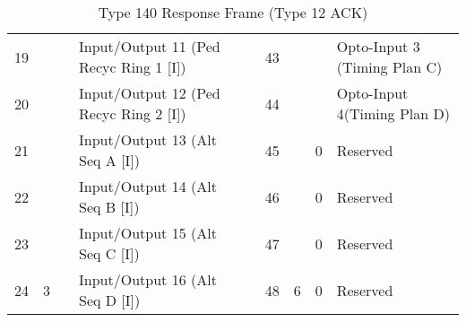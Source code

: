 \documentclass[]{article}
\begin{document}
\begin{landscape}
\begin{table}[]
\begin{tabular}{lllllllll}
			19           &                     &                & Input/Output 11 (Ped Recyc Ring 1 {[}I{]})   &                    & 43           &                     &                & Opto-Input 3 (Timing Plan C)          \\
			20           &                     &                & Input/Output 12 (Ped Recyc Ring 2 {[}I{]})   &                    & 44           &                     &                & Opto-Input 4(Timing Plan D)           \\ \cline{8-9} 
			21           &                     &                & Input/Output 13 (Alt Seq A {[}I{]})          &                    & 45           &                     & 0              & Reserved                              \\
			22           &                     &                & Input/Output 14 (Alt Seq B {[}I{]})          &                    & 46           &                     & 0              & Reserved                              \\
			23           &                     &                & Input/Output 15 (Alt Seq C {[}I{]})          &                    & 47           &                     & 0              & Reserved                              \\
			24           & \multirow{-8}{*}{3} &                & Input/Output 16 (Alt Seq D {[}I{]})          &                    & 48           & \multirow{-8}{*}{6} & 0              & Reserved                              \\ \cline{1-4} \cline{6-9} 
		\end{tabular}
		\caption{Type 140 Response Frame (Type 12 ACK)}
		\label{tab:type-140-frame}
	\end{table}
\end{landscape}
\end{document}
